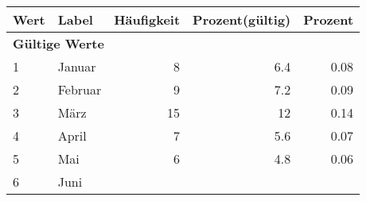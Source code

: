      \begin{longtable}{lXrrr}
     \toprule
     \textbf{Wert} & \textbf{Label} & \textbf{Häufigkeit} & \textbf{Prozent(gültig)} & \textbf{Prozent} \\
     \endhead
     \midrule
     \multicolumn{5}{l}{\textbf{Gültige Werte}}\\

     1 &
     \multicolumn{1}{X}{ Januar   } &


       \num{8} &
       \num[round-mode=places,round-precision=2]{6,4} &
         \num[round-mode=places,round-precision=2]{0,08} \\

     2 &
     \multicolumn{1}{X}{ Februar   } &


       \num{9} &
       \num[round-mode=places,round-precision=2]{7,2} &
         \num[round-mode=places,round-precision=2]{0,09} \\

     3 &
     \multicolumn{1}{X}{ März   } &


       \num{15} &
       \num[round-mode=places,round-precision=2]{12} &
         \num[round-mode=places,round-precision=2]{0,14} \\

     4 &
     \multicolumn{1}{X}{ April   } &


       \num{7} &
       \num[round-mode=places,round-precision=2]{5,6} &
         \num[round-mode=places,round-precision=2]{0,07} \\

     5 &
     \multicolumn{1}{X}{ Mai   } &


       \num{6} &
       \num[round-mode=places,round-precision=2]{4,8} &
         \num[round-mode=places,round-precision=2]{0,06} \\

     6 &
     \multicolumn{1}{X}{ Juni   } &



\end{longtable}
